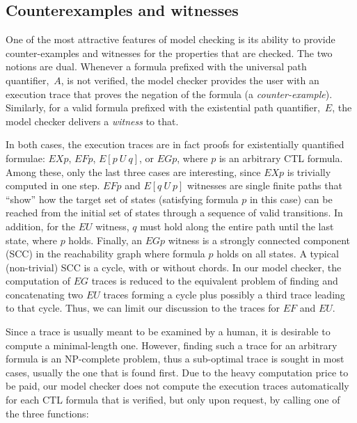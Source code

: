 \begin{private}
\section{Counterexamples and witnesses}


One of the most attractive features of model checking is its ability to provide
counter-examples and witnesses for the properties that are checked. The
two notions are dual. Whenever a formula prefixed with the universal path
quantifier,~$A$, is not verified, the model checker provides the user with
an execution trace that proves the negation of the formula (a
\emph{counter-example}). Similarly, for a valid formula prefixed with the
existential path quantifier,~$E$, the model checker delivers a
\emph{witness} to that.

In both cases, the execution traces are in fact proofs for
existentially quantified formulae: $EX p$, $EF p$, $E[p~U~q]$, or $EG p$,
where $p$ is an arbitrary CTL formula.
Among these, only the last three cases are interesting,
since $EX p$ is trivially computed in one step.
$EF p$ and $E[q~U~p]$ witnesses are single finite paths that ``show'' how the
target set of states (satisfying formula $p$ in this case) can be reached
from the initial set of states through a sequence of valid transitions.
In addition, for the $EU$ witness, $q$ must hold along the entire path until
the last state, where $p$ holds.
Finally, an $EG p$ witness is a strongly connected component (SCC) in the
reachability graph where formula $p$ holds on all states.
A typical (non-trivial) SCC is a cycle, with or without chords.
In our model checker, the computation of $EG$ traces is reduced to the
equivalent problem of finding and concatenating two $EU$ traces
forming a cycle plus possibly a third trace leading to that cycle.
Thus, we can limit our discussion to the traces for $EF$ and $EU$.

Since a trace is usually meant to be examined by a human, it is desirable
to compute a minimal-length one.
However, finding such a trace for an
arbitrary formula is an NP-complete problem, thus a sub-optimal trace is
sought in most cases, usually the one that is found first. Due to the
heavy computation price to be paid, our model checker does not compute the
execution traces automatically for each CTL formula that is verified, but
only upon request, by calling one of the three functions:


\end{private}
